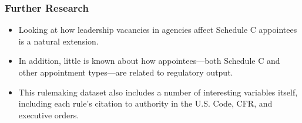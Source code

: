 \documentclass{beamer}
\begin{document}
\begin{frame}
\frametitle{Further Research}
\large
\begin{itemize}\addtolength{\itemsep}{1.75\baselineskip}
\item Looking at how leadership vacancies in agencies affect Schedule C appointees is a natural extension.
\item In addition, little is known about how appointees---both Schedule C and other appointment types---are related to regulatory output.
\item This rulemaking dataset also includes a number of interesting variables itself, including each rule's citation to authority in the U.S. Code, CFR, and executive orders. 
\end{itemize}
\end{frame}
\end{document}
